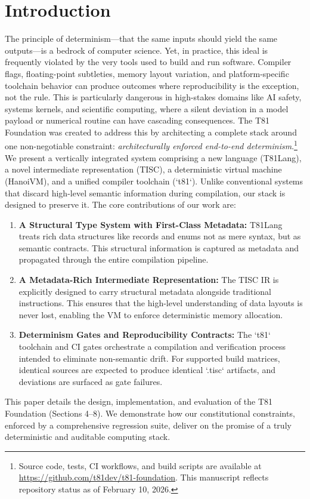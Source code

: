 \documentclass[sigconf, 10pt]{acmart}
\begin{document}
\section{Introduction}
The principle of determinism---that the same inputs should yield the same outputs---is a bedrock of computer science. Yet, in practice, this ideal is frequently violated by the very tools used to build and run software. Compiler flags, floating-point subtleties, memory layout variation, and platform-specific toolchain behavior can produce outcomes where reproducibility is the exception, not the rule. This is particularly dangerous in high-stakes domains like AI safety, systems kernels, and scientific computing, where a silent deviation in a model payload or numerical routine can have cascading consequences. The T81 Foundation was created to address this by architecting a complete stack around one non-negotiable constraint: \textit{architecturally enforced end-to-end determinism}.\footnote{Source code, tests, CI workflows, and build scripts are available at \url{https://github.com/t81dev/t81-foundation}. This manuscript reflects repository status as of February 10, 2026.}
We present a vertically integrated system comprising a new language (T81Lang), a novel intermediate representation (TISC), a deterministic virtual machine (HanoiVM), and a unified compiler toolchain (`t81`). Unlike conventional systems that discard high-level semantic information during compilation, our stack is designed to preserve it. The core contributions of our work are:
\begin{enumerate}
\item \textbf{A Structural Type System with First-Class Metadata:} T81Lang treats rich data structures like records and enums not as mere syntax, but as semantic contracts. This structural information is captured as metadata and propagated through the entire compilation pipeline.
\item \textbf{A Metadata-Rich Intermediate Representation:} The TISC IR is explicitly designed to carry structural metadata alongside traditional instructions. This ensures that the high-level understanding of data layouts is never lost, enabling the VM to enforce deterministic memory allocation.
\item \textbf{Determinism Gates and Reproducibility Contracts:} The `t81` toolchain and CI gates orchestrate a compilation and verification process intended to eliminate non-semantic drift. For supported build matrices, identical sources are expected to produce identical `.tisc` artifacts, and deviations are surfaced as gate failures.
\end{enumerate}
This paper details the design, implementation, and evaluation of the T81 Foundation (Sections 4--8). We demonstrate how our constitutional constraints, enforced by a comprehensive regression suite, deliver on the promise of a truly deterministic and auditable computing stack.
\end{document}
